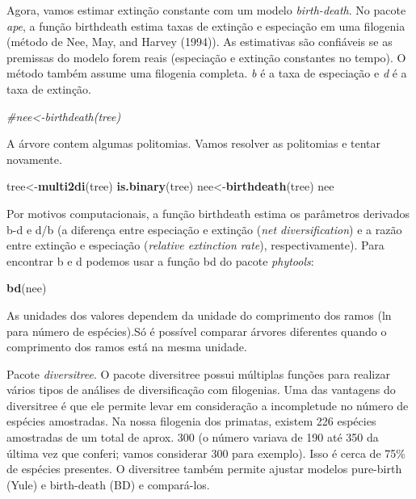 \documentclass[
]{book}
\newenvironment{Shaded}{\begin{snugshade}}{\end{snugshade}}
\newcommand{\CommentTok}[1]{\textcolor[rgb]{0.56,0.35,0.01}{\textit{#1}}}
\newcommand{\FunctionTok}[1]{\textcolor[rgb]{0.13,0.29,0.53}{\textbf{#1}}}
\newcommand{\NormalTok}[1]{#1}
\newcommand{\OtherTok}[1]{\textcolor[rgb]{0.56,0.35,0.01}{#1}}
\begin{document}
Agora, vamos estimar extinção constante com um modelo \emph{birth-death}. No pacote \emph{ape}, a função birthdeath estima taxas de extinção e especiação em uma filogenia (método de Nee, May, and Harvey (1994)). As estimativas são confiáveis se as premissas do modelo forem reais (especiação e extinção constantes no tempo). O método também assume uma filogenia completa. \emph{b} é a taxa de especiação e \emph{d} é a taxa de extinção.

\begin{Shaded}
\begin{Highlighting}[]
\CommentTok{\#nee\textless{}{-}birthdeath(tree)}
\end{Highlighting}
\end{Shaded}

A árvore contem algumas politomias. Vamos resolver as politomias e
tentar novamente.

\begin{Shaded}
\begin{Highlighting}[]
\NormalTok{tree}\OtherTok{\textless{}{-}}\FunctionTok{multi2di}\NormalTok{(tree)}
\FunctionTok{is.binary}\NormalTok{(tree)}
\NormalTok{nee}\OtherTok{\textless{}{-}}\FunctionTok{birthdeath}\NormalTok{(tree)}
\NormalTok{nee}
\end{Highlighting}
\end{Shaded}

Por motivos computacionais, a função birthdeath estima os parâmetros
derivados b-d e d/b (a diferença entre especiação e extinção (\emph{net
diversification}) e a razão entre extinção e especiação (\emph{relative
extinction rate}), respectivamente). Para encontrar b e d podemos usar a função bd do pacote \emph{phytools}:

\begin{Shaded}
\begin{Highlighting}[]
\FunctionTok{bd}\NormalTok{(nee)}
\end{Highlighting}
\end{Shaded}

As unidades dos valores dependem da unidade do comprimento dos ramos (ln para número de espécies).Só é possível comparar árvores diferentes quando o comprimento dos ramos está na mesma unidade.

Pacote \emph{diversitree}. O pacote diversitree possui múltiplas funções para realizar vários tipos de análises de diversificação com filogenias. Uma das vantagens do diversitree é que ele permite levar em consideração a incompletude no número de espécies amostradas. Na nossa filogenia dos primatas, existem 226 espécies amostradas de um total de aprox. 300 (o número variava de 190 até 350 da última vez que conferi; vamos considerar 300 para exemplo). Isso é cerca de 75\% de espécies presentes. O diversitree também permite ajustar modelos pure-birth (Yule) e birth-death (BD) e compará-los.
\end{document}
